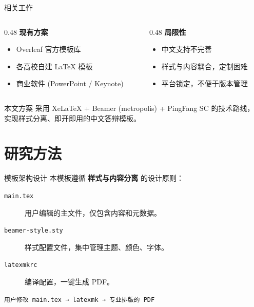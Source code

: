 \documentclass[aspectratio=169]{beamer}
\begin{document}
\begin{frame}{相关工作}
  \begin{columns}[T]
    \begin{column}{0.48\textwidth}
      \textbf{现有方案}
      \begin{itemize}
        \item Overleaf 官方模板库
        \item 各高校自建 \LaTeX{} 模板
        \item 商业软件 (PowerPoint / Keynote)
      \end{itemize}
    \end{column}
    \begin{column}{0.48\textwidth}
      \textbf{局限性}
      \begin{itemize}
        \item 中文支持不完善
        \item 样式与内容耦合，定制困难
        \item 平台锁定，不便于版本管理
      \end{itemize}
    \end{column}
  \end{columns}

  \vspace{1em}
  \begin{exampleblock}{本文方案}
    采用 XeLaTeX + Beamer (metropolis) + PingFang SC 的技术路线，
    实现样式分离、即开即用的中文答辩模板。
  \end{exampleblock}
\end{frame}

\section{研究方法}

\begin{frame}{模板架构设计}
  本模板遵循 \textbf{样式与内容分离} 的设计原则：

  \vspace{0.5em}
  \begin{description}
    \item[\texttt{main.tex}] 用户编辑的主文件，仅包含内容和元数据。
    \item[\texttt{beamer-style.sty}] 样式配置文件，集中管理主题、颜色、字体。
    \item[\texttt{latexmkrc}] 编译配置，一键生成 PDF。
  \end{description}

  \vspace{1em}
  \begin{center}
    \small
    \texttt{用户修改 main.tex → latexmk → 专业排版的 PDF}
  \end{center}
\end{frame}
\end{document}
